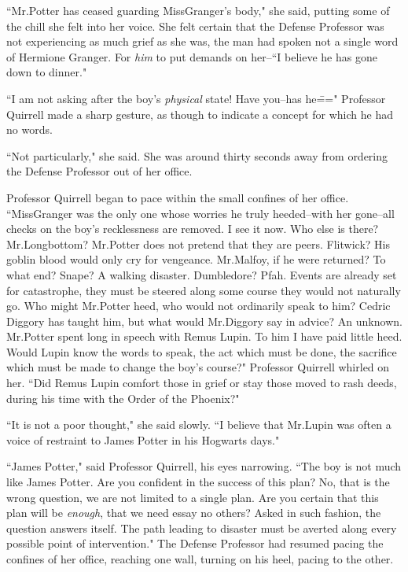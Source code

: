 ``Mr.\?Potter has ceased guarding Miss\?Granger's body," she said, putting some of the chill she felt into her voice. She felt certain that the Defense Professor was not experiencing as much grief as she was, the man had spoken not a single word of Hermione Granger. For \emph{him} to put demands on her\---``I believe he has gone down to dinner."

``I am not asking after the boy's \emph{physical} state! Have you\---has he\===" Professor Quirrell made a sharp gesture, as though to indicate a concept for which he had no words.

``Not particularly," she said. She was around thirty seconds away from ordering the Defense Professor out of her office.

Professor Quirrell began to pace within the small confines of her office. ``Miss\?Granger was the only one whose worries he truly heeded\---with her gone\---all checks on the boy's recklessness are removed. I see it now. Who else is there? Mr.\?Longbottom? Mr.\?Potter does not pretend that they are peers. Flitwick? His goblin blood would only cry for vengeance. Mr.\?Malfoy, if he were returned? To what end? Snape? A walking disaster. Dumbledore? Pfah. Events are already set for catastrophe, they must be steered along some course they would not naturally go. Who might Mr.\?Potter heed, who would not ordinarily speak to him? Cedric Diggory has taught him, but what would Mr.\?Diggory say in advice? An unknown. Mr.\?Potter spent long in speech with Remus Lupin. To him I have paid little heed. Would Lupin know the words to speak, the act which must be done, the sacrifice which must be made to change the boy's course?" Professor Quirrell whirled on her. ``Did Remus Lupin comfort those in grief or stay those moved to rash deeds, during his time with the Order of the Phoenix?"

``It is not a poor thought," she said slowly. ``I believe that Mr.\?Lupin was often a voice of restraint to James Potter in his Hogwarts days."

``James Potter," said Professor Quirrell, his eyes narrowing. ``The boy is not much like James Potter. Are you confident in the success of this plan? No, that is the wrong question, we are not limited to a single plan. Are you certain that this plan will be \emph{enough}, that we need essay no others? Asked in such fashion, the question answers itself. The path leading to disaster must be averted along every possible point of intervention." The Defense Professor had resumed pacing the confines of her office, reaching one wall, turning on his heel, pacing to the other.

